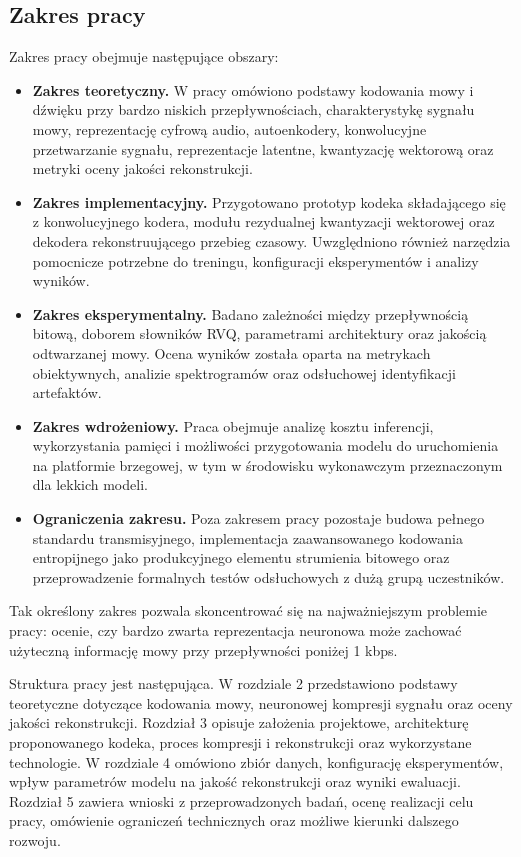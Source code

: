 \subsection{Zakres pracy}
\label{subsec:zakres-pracy}

Zakres pracy obejmuje następujące obszary:

\begin{itemize}
    \item \textbf{Zakres teoretyczny.} W pracy omówiono podstawy kodowania mowy i dźwięku przy bardzo niskich przepływnościach, charakterystykę sygnału mowy, reprezentację cyfrową audio, autoenkodery, konwolucyjne przetwarzanie sygnału, reprezentacje latentne, kwantyzację wektorową oraz metryki oceny jakości rekonstrukcji.
    \item \textbf{Zakres implementacyjny.} Przygotowano prototyp kodeka składającego się z konwolucyjnego kodera, modułu rezydualnej kwantyzacji wektorowej oraz dekodera rekonstruującego przebieg czasowy. Uwzględniono również narzędzia pomocnicze potrzebne do treningu, konfiguracji eksperymentów i analizy wyników.
    \item \textbf{Zakres eksperymentalny.} Badano zależności między przepływnością bitową, doborem słowników RVQ, parametrami architektury oraz jakością odtwarzanej mowy. Ocena wyników została oparta na metrykach obiektywnych, analizie spektrogramów oraz odsłuchowej identyfikacji artefaktów.
    \item \textbf{Zakres wdrożeniowy.} Praca obejmuje analizę kosztu inferencji, wykorzystania pamięci i możliwości przygotowania modelu do uruchomienia na platformie brzegowej, w tym w środowisku wykonawczym przeznaczonym dla lekkich modeli.
    \item \textbf{Ograniczenia zakresu.} Poza zakresem pracy pozostaje budowa pełnego standardu transmisyjnego, implementacja zaawansowanego kodowania entropijnego jako produkcyjnego elementu strumienia bitowego oraz przeprowadzenie formalnych testów odsłuchowych z dużą grupą uczestników.
\end{itemize}

Tak określony zakres pozwala skoncentrować się na najważniejszym problemie pracy: ocenie, czy bardzo zwarta reprezentacja neuronowa może zachować użyteczną informację mowy przy przepływności poniżej 1 kbps.

Struktura pracy jest następująca. W rozdziale 2 przedstawiono podstawy teoretyczne dotyczące kodowania mowy, neuronowej kompresji sygnału oraz oceny jakości rekonstrukcji. Rozdział 3 opisuje założenia projektowe, architekturę proponowanego kodeka, proces kompresji i rekonstrukcji oraz wykorzystane technologie. W rozdziale 4 omówiono zbiór danych, konfigurację eksperymentów, wpływ parametrów modelu na jakość rekonstrukcji oraz wyniki ewaluacji. Rozdział 5 zawiera wnioski z przeprowadzonych badań, ocenę realizacji celu pracy, omówienie ograniczeń technicznych oraz możliwe kierunki dalszego rozwoju.

